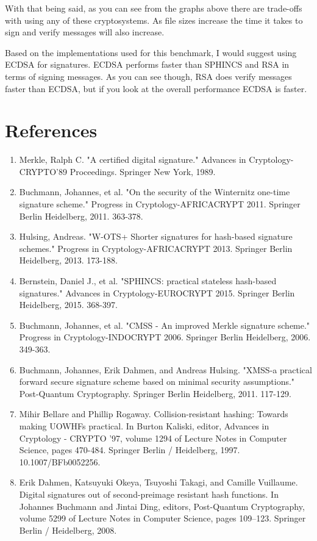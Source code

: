 \documentclass[]{scrartcl}
\begin{document}
With that being said, as you can see from the graphs above there are trade-offs with using any of these cryptosystems. As file sizes increase the time it takes to sign and verify messages will also increase. 

Based on the implementations used for this benchmark, I would suggest using ECDSA for signatures. ECDSA performs faster than SPHINCS and RSA in terms of signing messages. As you can see though, RSA does verify messages faster than ECDSA, but if you look at the overall performance ECDSA is faster.
\section*{References}
\begin{enumerate}
	\item Merkle, Ralph C. "A certified digital signature." Advances in Cryptology-CRYPTO'89 Proceedings. Springer New York, 1989.
	\item Buchmann, Johannes, et al. "On the security of the Winternitz one-time signature scheme." Progress in Cryptology-AFRICACRYPT 2011. Springer Berlin Heidelberg, 2011. 363-378.
	\item Hulsing, Andreas. "W-OTS+ Shorter signatures for hash-based signature schemes." Progress in Cryptology-AFRICACRYPT 2013. Springer Berlin Heidelberg, 2013. 173-188.
	\item Bernstein, Daniel J., et al. "SPHINCS: practical stateless hash-based signatures." Advances in Cryptology-EUROCRYPT 2015. Springer Berlin Heidelberg, 2015. 368-397.
	\item Buchmann, Johannes, et al. "CMSS - An improved Merkle signature scheme." Progress in Cryptology-INDOCRYPT 2006. Springer Berlin Heidelberg, 2006. 349-363.
	\item Buchmann, Johannes, Erik Dahmen, and Andreas Hulsing. "XMSS-a practical forward secure signature scheme based on minimal security assumptions." Post-Quantum Cryptography. Springer Berlin Heidelberg, 2011. 117-129.
	\item Mihir Bellare and Phillip Rogaway. Collision-resistant hashing: Towards making UOWHFs practical. In Burton Kaliski, editor, Advances in Cryptology - CRYPTO '97, volume 1294 of Lecture Notes in Computer Science, pages 470-484. Springer Berlin / Heidelberg, 1997. 10.1007/BFb0052256.
	\item Erik Dahmen, Katsuyuki Okeya, Tsuyoshi Takagi, and Camille Vuillaume. Digital signatures out of second-preimage resistant hash functions. In Johannes Buchmann and Jintai Ding, editors, Post-Quantum Cryptography, volume 5299 of Lecture Notes in Computer Science, pages 109--123. Springer Berlin / Heidelberg, 2008.

\end{enumerate}
\end{document}
